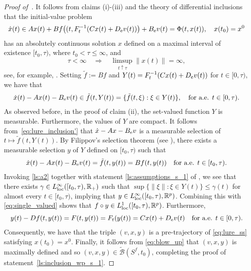 \documentclass[a4paper,11pt]{article}
\newcommand{\R}{\mathbb R}
\newcommand{\sB}{{\mathcal B}}
\numberwithin{equation}{section}
\numberwithin{figure}{section}
\numberwithin{table}{section}
\begin{document}
\begin{proof}[Proof of~]
It follows from claims (i)-(iii) and the theory of differential inclusions that the initial-value problem
\begin{equation}\label{eq:lure_inclusion}
\dot x(t)\in Ax(t)+Bf\big((t,F_t^{-1}(Cx(t)+D_{\rm e}v(t))\big)+B_{\rm e}v(t)=\Phi(t,x(t)),\quad x(t_0)=x^0
\end{equation}
has an absolutely continuous solution $x$ defined on a maximal interval of existence $[t_0,\tau)$,
where $t_0<\tau\leq\infty$, and
\begin{equation}\label{eq:blow_up}
\tau<\infty\quad\Longrightarrow\quad\limsup_{t\uparrow \tau}\|x(t)\|=\infty,
\end{equation}
see, for example, \cite[Corollary 5.2]{d92}. Setting $\tilde f:=Bf$ and $Y(t)=F_t^{-1}(Cx(t)+D_{\rm e}v(t))$ for $t\in[0,\tau)$, we have that
\begin{equation}\label{eq:lure_inclusion'}
\dot x(t)-Ax(t)-B_{\rm e}v(t)\in\tilde f(t,Y(t))=\{\tilde f(t,\xi):\xi\in Y(t)\},\quad\mbox{for a.e. $t\in[0,\tau)$}.
\end{equation}
As observed before, in the proof of claim (ii), the set-valued function $Y$ is measurable. Furthermore, the values of $Y$ are compact. It follows from~\eqref{eq:lure_inclusion'} that $\dot x-Ax-B_{\rm e}v$ is a measurable selection of $t\mapsto\tilde f(t,Y(t))$. By  Filippov's selection theorem (see \cite[Theorem 2.3.13]{v00}), there exists a measurable selection $y$ of $Y$ defined on $[t_0,\tau)$ such that
\[
\dot x(t)-Ax(t)-B_{\rm e}v(t)=\tilde f(t,y(t))=Bf(t,y(t))\quad\mbox{for a.e. $t\in[t_0,\tau)$}.
\]
Invoking \ref{ls:a2} together with statement \ref{ls:assumptions_s_1} of , we see that there exists $\gamma\in L^\infty_{\rm loc}([t_0,\tau),\R_+)$ such that $\sup\{\|\xi\|:\xi\in Y(t)\}\leq\gamma(t)$ for almost every $t\in[t_0,\tau)$,
implying that $y\in L^\infty_{\rm loc}([t_0,\tau),\R^p)$. Combining this with \eqref{eq:single_valued}
shows that $f\circ y\in L^1_{\rm loc}([t_0,\tau),\R^p)$. Furthermore,
\begin{equation}\label{eq:lure_inclusion_p1}
     y(t)-Df(t,y(t))=F(t,y(t))=F_t(y(t))=Cx(t)+D_{\rm e}v(t)\quad\mbox{for a.e. $t\in[0,\tau)$}.
\end{equation}
Consequently, we have that the triple $(v,x,y)$ is a pre-trajectory of \eqref{eq:lure_ss} satisfying
$x(t_0)=x^0$. Finally, it follows from \eqref{eq:blow_up} that  $(v,x,y)$ is maximally defined and so
$(v,x,y)\in\tilde\sB(S^f,t_0)$, completing the proof of statement~\ref{ls:inclusion_wp_s_1}.


\end{proof}
\end{document}

